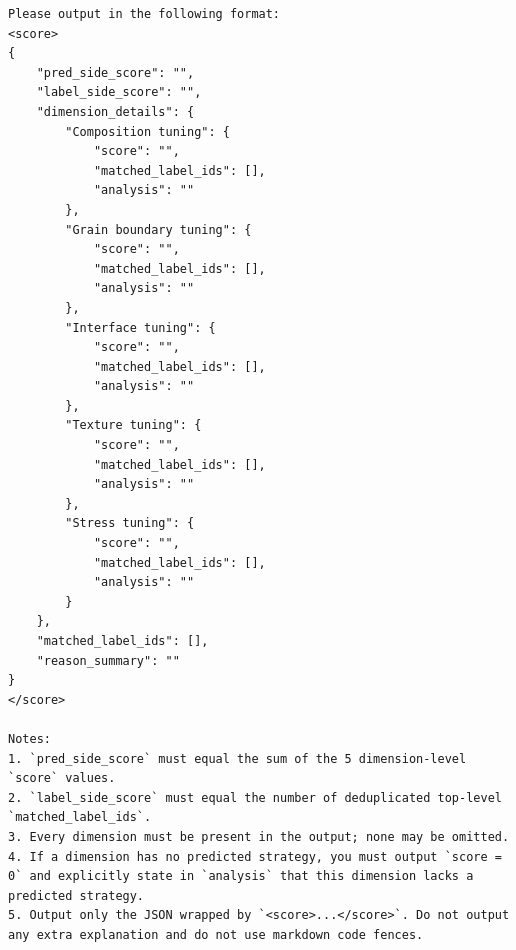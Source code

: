 \begin{lstlisting}[style=jsonstyle]
Please output in the following format:
<score>
{
    "pred_side_score": "",
    "label_side_score": "",
    "dimension_details": {
        "Composition tuning": {
            "score": "",
            "matched_label_ids": [],
            "analysis": ""
        },
        "Grain boundary tuning": {
            "score": "",
            "matched_label_ids": [],
            "analysis": ""
        },
        "Interface tuning": {
            "score": "",
            "matched_label_ids": [],
            "analysis": ""
        },
        "Texture tuning": {
            "score": "",
            "matched_label_ids": [],
            "analysis": ""
        },
        "Stress tuning": {
            "score": "",
            "matched_label_ids": [],
            "analysis": ""
        }
    },
    "matched_label_ids": [],
    "reason_summary": ""
}
</score>

Notes:
1. `pred_side_score` must equal the sum of the 5 dimension-level `score` values.
2. `label_side_score` must equal the number of deduplicated top-level `matched_label_ids`.
3. Every dimension must be present in the output; none may be omitted.
4. If a dimension has no predicted strategy, you must output `score = 0` and explicitly state in `analysis` that this dimension lacks a predicted strategy.
5. Output only the JSON wrapped by `<score>...</score>`. Do not output any extra explanation and do not use markdown code fences.
\end{lstlisting}


